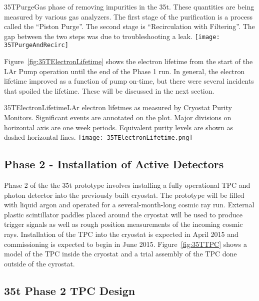 \begin{cdrfigure}{35TPurge}{Gas phase of removing impurities in the 35t. These quantities are being measured by various gas analyzers. The first stage of the purification is a process called the ``Piston Purge''.  The second stage is ``Recirculation with Filtering''. The gap between the two steps was due to troubleshooting a leak.}
  \texttt{[image: 35TPurgeAndRecirc]}
\end{cdrfigure}

Figure~\ref{fig:35TElectronLifetime} shows the electron lifetime from the start of the LAr Pump operation until the end of the Phase 1 run. In general, the electron lifetime improved as a function of pump 
on-time, but there were several incidents that spoiled the lifetime.  These will be discussed in the next section.

\begin{cdrfigure}{35TElectronLifetime}{LAr electron lifetmes as measured by 
Cryostat Purity Monitors. Significant events are annotated on the plot. Major divisions on horizontal axis 
are one week periods. Equivalent purity levels are shown as dashed horizontal lines.}
  \texttt{[image: 35TElectronLifetime.png]}
\end{cdrfigure}

\subsection{Phase 2 - Installation of Active Detectors}
Phase 2 of the the 35t prototype involves installing a fully operational TPC and photon detector into 
the previously built cryostat.
The prototype will be filled with liquid argon and operated for a several-month-long cosmic ray run. 
External plastic scintillator paddles placed around the cryostat will be used to produce
trigger signals as well as rough position measurements of the incoming cosmic rays.
Installation of the TPC into the cryostat is expected in April 2015 and 
commissioning is expected to begin in June 2015.
Figure~\ref{fig:35TTPC} shows a model of the TPC inside the cryostat and a trial assembly of
the TPC done outside of the cyrostat. 

\subsection{35t Phase 2 TPC Design}

